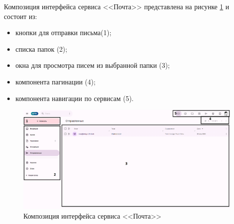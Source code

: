Композиция интерфейса сервиса <<Почта>> представлена на рисунке \ref{templ:image1} и состоит из:
\begin{itemize}
  \item кнопки для отправки письма(1);
  \item списка папок (2);
  \item окна для просмотра писем из выбранной папки (3);
  \item компонента пагинации (4);
  \item компонента навигации по сервисам (5).
\end{itemize}
\begin{figure}[H]
	\centering
	\includegraphics[width=1\linewidth]{images/почта}
	\caption{Композиция интерфейса сервиса <<Почта>>}
	\label{templ:image1}
\end{figure}

